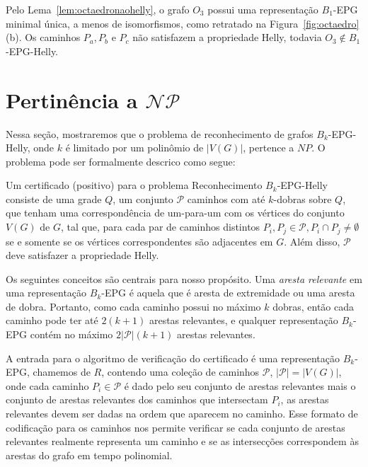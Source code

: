 Pelo Lema~\ref{lem:octaedronaohelly}, o grafo $ O_3 $ possui uma representação  $B_1$-EPG minimal única, a menos de isomorfismos, como retratado na Figura~\ref{fig:octaedro}(b). Os caminhos $ P_a, P_b $ e $ P_c $  não satisfazem a propriedade Helly, todavia $O_3 \notin B_1$-EPG-Helly. 

\section{Pertinência a $\mathcal{NP}$}

Nessa seção, mostraremos que o problema de reconhecimento de grafos $B_k$-EPG-Helly, onde $k$ é limitado por um polinômio de $|V(G)|$, pertence a  $NP$. O problema pode ser formalmente descrico como segue:



Um certificado (positivo) para o problema {\sc Reconhecimento $B_k$-EPG-Helly} consiste de uma grade $Q$, um conjunto $\mathcal{P}$ caminhos com até $k$-dobras sobre $Q$, que tenham uma correspondência de um-para-um com os vértices do conjunto $V(G)$ de $G$, tal que, para cada par de caminhos distintos $P_i, P_j\in \mathcal{P}, P_i\cap P_j \neq \emptyset $  se e somente se os vértices correspondentes são adjacentes em $G$. Além disso, $\mathcal{P}$ deve satisfazer a propriedade Helly.

Os seguintes conceitos são centrais para nosso propósito.
Uma \emph{aresta relevante} em uma representação $B_k$-EPG é aquela que é aresta de extremidade ou uma aresta de dobra. Portanto, como cada caminho possui no máximo $k$ dobras, então cada caminho pode ter até $2(k+1)$ arestas relevantes, e qualquer representação $B_k$-EPG contém no máximo $2|\mathcal{P}|(k+1)$ arestas relevantes.

A entrada para o algoritmo de verificação do certificado é uma representação $B_k$-EPG, chamemos de $R$, contendo uma coleção de caminhos $\mathcal{P}$, $|\mathcal{P}|=|V(G)|$, onde cada caminho  $P_i \in \mathcal{P}$ é dado pelo seu conjunto de arestas relevantes mais o conjunto de arestas relevantes dos caminhos que intersectam   $P_i$, as arestas relevantes devem ser dadas na ordem que aparecem no caminho. Esse formato de codificação para os caminhos nos permite verificar se cada conjunto de arestas relevantes realmente representa um caminho e se as intersecções correspondem às arestas do grafo em tempo polinomial.

